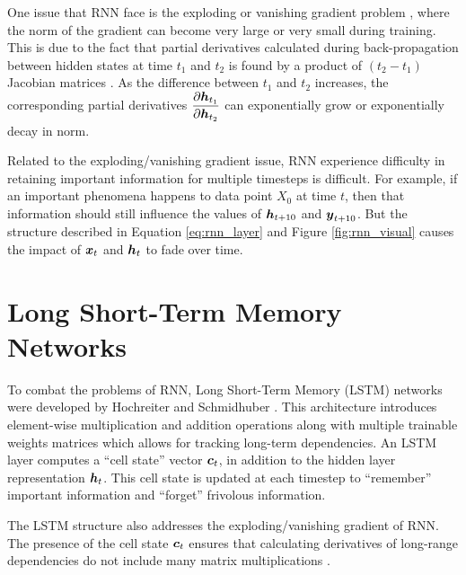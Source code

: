 One issue that RNN face is the exploding or vanishing gradient problem \cite{bengio1994}, where the norm of the gradient can become very large or very small during training. This is due to the fact that partial derivatives calculated during back-propagation between hidden states at time $t_1$ and $t_2$ is found by a product of $(t_2 - t_1)$ Jacobian matrices \cite{pascanu2013}. As the difference between $t_1$ and $t_2$ increases, the corresponding partial derivatives $\displaystyle\frac{\partial \boldsymbol{h}_{t_1}}{\partial \boldsymbol{h}_{t_2}}$ can exponentially grow or exponentially decay in norm.

Related to the exploding/vanishing gradient issue, RNN experience difficulty in retaining important information for multiple timesteps is difficult. For example, if an important phenomena happens to data point $X_0$ at time $t$, then that information should still influence the values of $\boldsymbol{h}_{t+10}$ and $\boldsymbol{y}_{t+10}$. But the structure described in Equation \ref{eq:rnn_layer} and Figure \ref{fig:rnn_visual} causes the impact of $\boldsymbol{x}_t$ and $\boldsymbol{h}_t$ to fade over time.


\section{Long Short-Term Memory Networks}\label{sec:lstm}
To combat the problems of RNN, Long Short-Term Memory (LSTM) networks were developed by Hochreiter and Schmidhuber \cite{hochreiter1997}. This architecture introduces element-wise multiplication and addition operations along with multiple trainable weights matrices which allows for tracking long-term dependencies. An LSTM layer computes a ``cell state'' vector $\boldsymbol{c}_t$, in addition to the hidden layer representation $\boldsymbol{h}_t$. This cell state is updated at each timestep to ``remember'' important information and ``forget'' frivolous information.

The LSTM structure also addresses the exploding/vanishing gradient of RNN. The presence of the cell state $\boldsymbol{c}_t$ ensures that calculating derivatives of long-range dependencies do not include many matrix multiplications \cite{hochreiter1997}.

